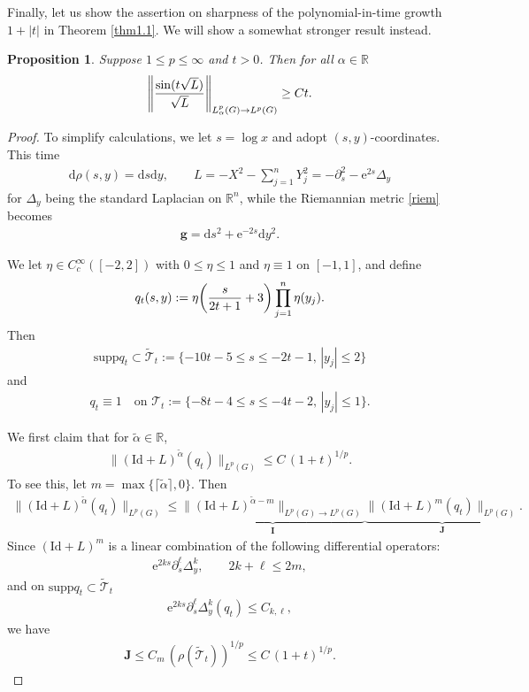 \documentclass[a4paper,12pt]{amsart}
\numberwithin{equation}{section}
\newtheorem{proposition}[theorem]{Proposition}
\theoremstyle{definition}
\theoremstyle{remark}
\numberwithin{theorem}{section}
\newcommand{\R}{\mathbb{R}}
\newcommand{\e}{\mathrm{e}}
\newcommand{\Id}{\mathrm{Id}}
\newcommand{\supp}{\mathrm{supp}}
\newcommand{\g}{\mathbf{g}}
\renewcommand{\d}{\mathrm{d}}
\begin{document}
Finally, let us show the assertion on sharpness of the polynomial-in-time growth $1+|t|$ in Theorem \ref{thm1.1}. We will show a somewhat stronger result instead.
\begin{proposition}\label{prop5.1}
Suppose $1\leq p\leq\infty$ and $t>0$. Then for all $\alpha\in\R$
\begin{align*}
\left\|{\sin(t\sqrt{L})\over\sqrt{L}}\right\|_{L^p_\alpha(G)\to L^p(G)}\geq Ct.
\end{align*}
\end{proposition}
\begin{proof}
To simplify calculations, we let $s=\log x$ and adopt $(s,y)$-coordinates. This time
\begin{align*}
\d\rho(s,y)=\d s\d y,\qquad L=-X^2-\sum_{j=1}^nY_j^2=-\partial_s^2-\e^{2s}\Delta_y
\end{align*}
for $\Delta_y$ being the standard Laplacian on $\R^n$, while the Riemannian metric \eqref{riem} becomes
\begin{align}\label{riem-sy}
\g=\d s^2+\e^{-2s}\d y^2.
\end{align}

We let $\eta\in C^\infty_c([-2,2])$ with $0\leq \eta\leq 1$ and $\eta\equiv 1$ on $[-1,1]$, and define
\begin{align*}
q_t(s,y):=\eta\!\left({s\over 2t+1}+3\right)\prod_{j=1}^n\eta(y_j).
\end{align*}
Then
\begin{align*}
\supp q_t\subset \widetilde{\mathcal{T}}_t:=\{-10t-5\leq s\leq -2t-1,\, |y_j|\leq 2\}
\end{align*}
and
\begin{align*}
q_t\equiv 1\quad\text{on }\mathcal{T}_t:=\{-8t-4\leq s\leq -4t-2,\, |y_j|\leq 1\}.
\end{align*}
\smallskip

We first claim that for $\widetilde{\alpha}\in\R$,
\begin{align}\label{eq:prop5.1claim}
\|(\Id+L)^{\widetilde{\alpha}}(q_t)\|_{L^p(G)}\leq C\, (1+t)^{1/p}.
\end{align}
To see this, let $m=\max\{\lceil\widetilde{\alpha}\rceil,0\}$. Then
\begin{align}\label{eq:6.2}
\|(\Id+L)^{\widetilde{\alpha}}(q_t)\|_{L^p(G)}\leq \underbrace{\|(\Id+L)^{\widetilde{\alpha}-m}\|_{L^p(G)\to L^p(G)}}_{\mathbf I}\underbrace{\|(\Id+L)^m(q_t)\|_{L^p(G)}}_{\mathbf J}.
\end{align}
Since $(\Id+L)^m$ is a linear combination of the following differential operators:
\begin{align*}
\e^{2ks}\partial_s^\ell\Delta_y^k,\qquad 2k+\ell\leq 2m,
\end{align*}
and on $\supp q_t\subset \widetilde{\mathcal{T}}_t$
\begin{align*}
\e^{2ks}\partial_s^\ell\Delta_y^k(q_t)\leq C_{k,\ell},
\end{align*}
we have
\begin{align*}
\mathbf J\leq C_m\,(\rho(\widetilde{\mathcal{T}}_t))^{1/p}\leq C\, (1+t)^{1/p}.
\end{align*}


\end{proof}
\end{document}
